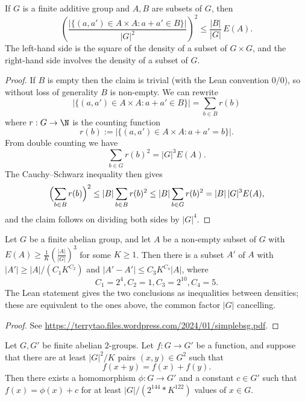 \begin{lemma}
  \label{cs-bound}
  \leanok

  If $G$ is a finite additive group and $A,B$ are subsets of $G$, then
  $$ \left( \frac{|\{ (a,a') \in A \times A: a+a' \in B \}|}{|G|^2} \right)^2
     \leq \frac{|B|}{|G|}\, E(A). $$
  The left-hand side is the square of the density of a subset of $G \times G$, and the
  right-hand side involves the density of a subset of $G$.
\end{lemma}
\begin{proof}
  \leanok

  If $B$ is empty then the claim is trivial (with the Lean convention $0/0$),
  so without loss of generality $B$ is non-empty.  We can rewrite
  $$ |\{ (a,a') \in A \times A: a+a' \in B \}| = \sum_{b \in B} r(b)$$
  where $r: G \to \N$ is the counting function
  $$ r(b) := |\{ (a,a') \in A \times A: a+a' = b \}|.$$
  From double counting we have
  $$ \sum_{b \in G} r(b)^2 = |G|^3 E(A).$$
  The Cauchy--Schwarz inequality then gives
  $$ \Bigl( \sum_{b \in B} r(b) \Bigr)^2 \leq |B| \sum_{b \in B} r(b)^2
     \leq |B| \sum_{b \in G} r(b)^2 = |B|\, |G|^3 E(A),$$
  and the claim follows on dividing both sides by $|G|^4$.
\end{proof}

\begin{lemma}
  \label{bsg}
  \leanok

  Let $G$ be a finite abelian group, and let $A$ be a non-empty subset of $G$
  with $E(A) \geq \frac{1}{K} \left( \frac{|A|}{|G|} \right)^3$ for some $K \geq 1$.
  Then there is a subset $A'$ of $A$ with $|A'| \geq |A| / (C_1 K^{C_2})$ and
  $|A'-A'| \leq C_3 K^{C_4} |A|$, where
  $$C_1 = 2^4, C_2 = 1, C_3 = 2^{10}, C_4 = 5.$$
  The Lean statement gives the two conclusions as inequalities between densities; these are
  equivalent to the ones above, the common factor $|G|$ cancelling.
\end{lemma}
\begin{proof}
  \leanok

  See \url{https://terrytao.files.wordpress.com/2024/01/simplebsg.pdf}.
\end{proof}

\begin{theorem}\label{approx-hom-pfr}\leanok Let $G,G'$ be finite abelian $2$-groups.
  Let $f: G \to G'$ be a function, and suppose that there are at least $|G|^2 / K$ pairs $(x,y) \in G^2$ such that
$$ f(x+y) = f(x) + f(y).$$
Then there exists a homomorphism $\phi: G \to G'$ and a constant $c \in G'$
such that $f(x) = \phi(x)+c$ for at least $|G| / (2 ^ {144} * K ^ {122})$
values of $x \in G$.
\end{theorem}

